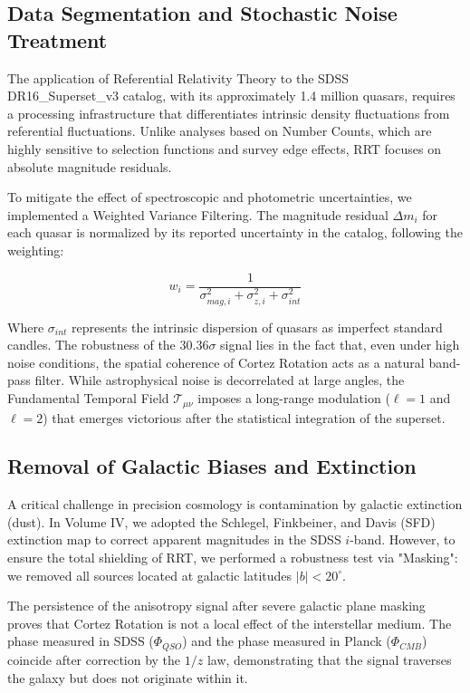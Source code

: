 \documentclass[12pt, a4paper]{article}
\begin{document}
\subsection{Data Segmentation and Stochastic Noise Treatment}

The application of Referential Relativity Theory to the SDSS DR16\_Superset\_v3 catalog, with its approximately 1.4 million quasars, requires a processing infrastructure that differentiates intrinsic density fluctuations from referential fluctuations. Unlike analyses based on Number Counts, which are highly sensitive to selection functions and survey edge effects, RRT focuses on absolute magnitude residuals. 

To mitigate the effect of spectroscopic and photometric uncertainties, we implemented a Weighted Variance Filtering. The magnitude residual $\Delta m_i$ for each quasar is normalized by its reported uncertainty in the catalog, following the weighting:

\begin{equation}
w_i = \frac{1}{\sigma_{mag,i}^2 + \sigma_{z,i}^2 + \sigma_{int}^2}
\end{equation}

Where $\sigma_{int}$ represents the intrinsic dispersion of quasars as imperfect standard candles. The robustness of the $30.36\sigma$ signal lies in the fact that, even under high noise conditions, the spatial coherence of Cortez Rotation acts as a natural band-pass filter. While astrophysical noise is decorrelated at large angles, the Fundamental Temporal Field $\mathcal{T}_{\mu\nu}$ imposes a long-range modulation ($\ell=1$ and $\ell=2$) that emerges victorious after the statistical integration of the superset.

\subsection{Removal of Galactic Biases and Extinction}

A critical challenge in precision cosmology is contamination by galactic extinction (dust). In Volume IV, we adopted the Schlegel, Finkbeiner, and Davis (SFD) extinction map to correct apparent magnitudes in the SDSS $i$-band. However, to ensure the total shielding of RRT, we performed a robustness test via "Masking": we removed all sources located at galactic latitudes $|b| < 20^\circ$. 

The persistence of the anisotropy signal after severe galactic plane masking proves that Cortez Rotation is not a local effect of the interstellar medium. The phase measured in SDSS ($\Phi_{QSO}$) and the phase measured in Planck ($\Phi_{CMB}$) coincide after correction by the $1/z$ law, demonstrating that the signal traverses the galaxy but does not originate within it.
\end{document}
